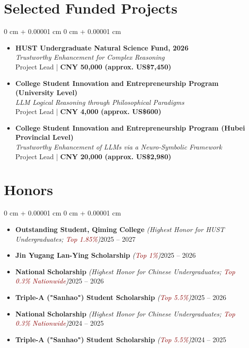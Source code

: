 \documentclass[10pt, letterpaper]{article}
\newcommand{\honornote}[1]{{\small\fontfamily{ptm}\selectfont\itshape (#1)}}
\newcommand{\honornote}[1]{{\small\honornotefont\itshape (#1)}}
\newcommand{\distinction}[1]{\textcolor{darkRed}{#1}}
\newenvironment{onecolentry}{
    \begin{adjustwidth}{
        0 cm + 0.00001 cm
    }{
        0 cm + 0.00001 cm
    }
}{
\end{adjustwidth}
} %
\begin{document}
\endgroup

\section{Selected Funded Projects}

\begin{onecolentry}
\begin{itemize}[leftmargin=10pt, topsep=0.10cm, itemsep=0.22cm, parsep=0pt]
\item \textbf{HUST Undergraduate Natural Science Fund, 2026} \\
\textit{Trustworthy Enhancement for Complex Reasoning} \\
Project Lead \quad | \quad \textbf{CNY 50,000 (approx. US\$7,450)}
\item \textbf{College Student Innovation and Entrepreneurship Program (University Level)} \\
\textit{LLM Logical Reasoning through Philosophical Paradigms} \\
Project Lead \quad | \quad \textbf{CNY 4,000 (approx. US\$600)}
\item \textbf{College Student Innovation and Entrepreneurship Program (Hubei Provincial Level)} \\
\textit{Trustworthy Enhancement of LLMs via a Neuro-Symbolic Framework} \\
Project Lead \quad | \quad \textbf{CNY 20,000 (approx. US\$2,980)}
\end{itemize}
\end{onecolentry}

\vspace{0.12cm}
\section{Honors}

\newcommand{\honorentry}[3]{\item \textbf{#1} \honornote{#2}\hfill #3}
\begin{onecolentry}
\begin{itemize}[leftmargin=10pt, topsep=0.10cm, itemsep=0.12cm, parsep=0pt]
\honorentry{Outstanding Student, Qiming College}{Highest Honor for HUST Undergraduates; \distinction{Top 1.85\%}}{2025 -- 2027}
\honorentry{Jin Yugang Lan-Ying Scholarship}{\distinction{Top 1\%}}{2025 -- 2026}
\honorentry{National Scholarship}{Highest Honor for Chinese Undergraduates; \distinction{Top 0.3\% Nationwide}}{2025 -- 2026}
\honorentry{Triple-A ("Sanhao") Student Scholarship}{\distinction{Top 5.5\%}}{2025 -- 2026}
\honorentry{National Scholarship}{Highest Honor for Chinese Undergraduates; \distinction{Top 0.3\% Nationwide}}{2024 -- 2025}
\honorentry{Triple-A ("Sanhao") Student Scholarship}{\distinction{Top 5.5\%}}{2024 -- 2025}
\end{itemize}
\end{onecolentry}
\end{document}
